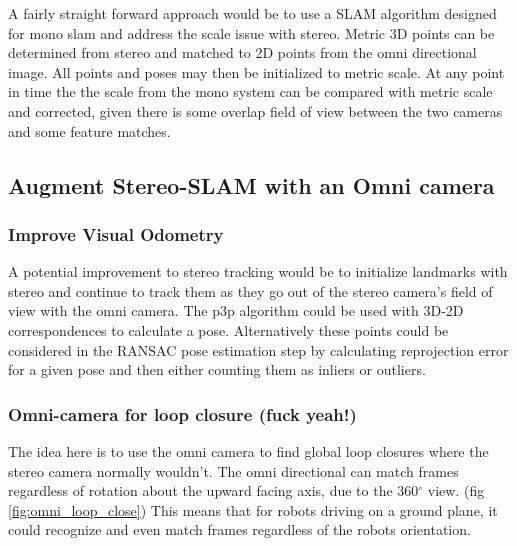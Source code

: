 A fairly straight forward approach would be to use a SLAM algorithm designed for mono slam and address the scale issue with stereo.  Metric 3D points can be determined from stereo and matched to 2D points from the omni directional image.  All points and poses may then be initialized to metric scale.  At any point in time the the scale from the mono system can be compared with metric scale and corrected, given there is some overlap field of view between the two cameras and some feature matches.

\subsection{Augment Stereo-SLAM with an Omni camera}

\subsubsection{Improve Visual Odometry}

A potential improvement to stereo tracking would be to initialize landmarks with stereo and continue to track them as they go out of the stereo camera's field of view with the omni camera.  The p3p algorithm could be used with 3D-2D correspondences to calculate a pose.  Alternatively these points could be considered in the RANSAC pose estimation step by calculating reprojection error for a given pose and then either counting them as inliers or outliers.

\subsubsection{Omni-camera for loop closure (fuck yeah!)}

The idea here is to use the omni camera to find global loop closures where the stereo camera normally wouldn't.  The omni directional can match frames regardless of rotation about the upward facing axis, due to the 360$^{\circ}$ view.  (fig \ref{fig:omni_loop_close}) This means that for robots driving on a ground plane, it could recognize and even match frames regardless of the robots orientation.

